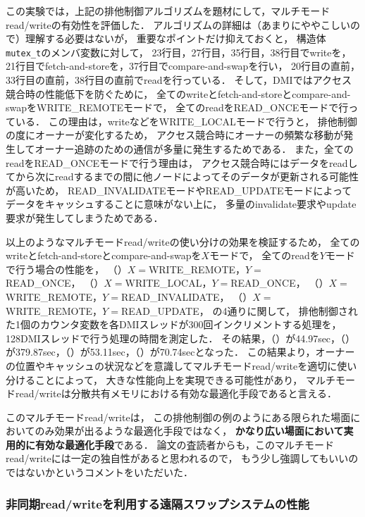 \documentclass[10pt]{jsarticle}
\begin{document}
この実験では，上記の排他制御アルゴリズムを題材にして，マルチモードread/writeの有効性を評価した．
アルゴリズムの詳細は（あまりにややこしいので）理解する必要はないが，
重要なポイントだけ抑えておくと，
構造体\texttt{mutex\_t}のメンバ変数に対して，
23行目，27行目，35行目，38行目でwriteを，
21行目でfetch-and-storeを，37行目でcompare-and-swapを行い，
20行目の直前，33行目の直前，38行目の直前でreadを行っている．
そして，DMIではアクセス競合時の性能低下を防ぐために，
全てのwriteとfetch-and-storeとcompare-and-swapをWRITE\_REMOTEモードで，
全てのreadをREAD\_ONCEモードで行っている．
この理由は，writeなどをWRITE\_LOCALモードで行うと，
排他制御の度にオーナーが変化するため，
アクセス競合時にオーナーの頻繁な移動が発生してオーナー追跡のための通信が多量に発生するためである．
また，全てのreadをREAD\_ONCEモードで行う理由は，
アクセス競合時にはデータをreadしてから次にreadするまでの間に他ノードによってそのデータが更新される可能性が高いため，
READ\_INVALIDATEモードやREAD\_UPDATEモードによってデータをキャッシュすることに意味がない上に，
多量のinvalidate要求やupdate要求が発生してしまうためである．

以上のようなマルチモードread/writeの使い分けの効果を検証するため，
全てのwriteとfetch-and-storeとcompare-and-swapを$X$モードで，
全てのreadを$Y$モードで行う場合の性能を，
（\I）$X=$WRITE\_REMOTE，$Y=$READ\_ONCE，
（\II）$X=$WRITE\_LOCAL，$Y=$READ\_ONCE，
（\III）$X=$WRITE\_REMOTE，$Y=$READ\_INVALIDATE，
（\IV）$X=$WRITE\_REMOTE，$Y=$READ\_UPDATE，
の4通りに関して，
排他制御された1個のカウンタ変数を各DMIスレッドが300回インクリメントする処理を，
128DMIスレッドで行う処理の時間を測定した．
その結果，（\I）が44.97sec，（\II）が379.87sec，（\III）が53.11sec，（\IV）が70.74secとなった．
この結果より，オーナーの位置やキャッシュの状況などを意識してマルチモードread/writeを適切に使い分けることによって，
大きな性能向上を実現できる可能性があり，
マルチモードread/writeは分散共有メモリにおける有効な最適化手段であると言える．

このマルチモードread/writeは，
この排他制御の例のようにある限られた場面においてのみ効果が出るような最適化手段ではなく，
\textbf{かなり広い場面において実用的に有効な最適化手段}である．
論文の査読者からも，このマルチモードread/writeには一定の独自性があると思われるので，
もう少し強調してもいいのではないかというコメントをいただいた．

\subsubsection{非同期read/writeを利用する遠隔スワップシステムの性能}
\label{sec:perform_swap}
\end{document}
